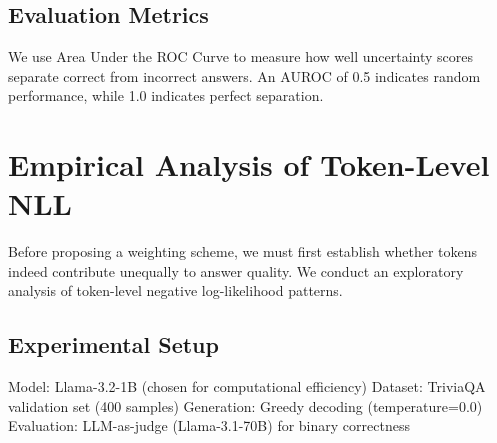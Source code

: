 \documentclass[a4paper,oneside,10pt,ngerman,english]{scrbook}
\begin{document}
\section{Evaluation Metrics}
We use Area Under the ROC Curve to measure how well uncertainty scores separate correct from incorrect answers. An AUROC of 0.5 indicates random performance, while 1.0 indicates perfect separation.

\chapter{Empirical Analysis of Token-Level NLL}
\label{ch:token-analysis}
%
Before proposing a weighting scheme, we must first establish whether tokens indeed contribute unequally to answer quality. We conduct an exploratory analysis of token-level negative log-likelihood patterns.
\section{Experimental Setup}
Model: Llama-3.2-1B (chosen for computational efficiency)
Dataset: TriviaQA validation set (400 samples)
Generation: Greedy decoding (temperature=0.0)
Evaluation: LLM-as-judge (Llama-3.1-70B) for binary correctness
\end{document}
